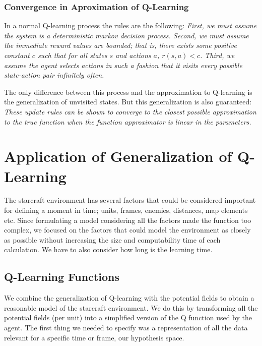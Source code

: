 \subsubsection{Convergence in Aproximation of Q-Learning}

In a normal Q-learning process the rules are the following: \textit{First, we must assume the system is a deterministic markov decision process. Second, we must assume the immediate reward values are bounded; that is, there exists some positive constant $c$ such that for all states $s$ and actions $a$, $r(s,a) < c$. Third, we assume the agent selects actions in such a fashion that it visits every possible state-action pair infinitely often.} \cite[p377]{ml_tom_mitchel} 

The only difference between this process and the approximation to Q-learning is the generalization of unvisited states. But this generalization is also guaranteed: \textit{These update rules can be shown to converge to the closest possible approximation to the true function when the function approximator is linear in the parameters. }\cite[p779]{rl}



\section{Application of Generalization of Q-Learning}	\label{qlearning}

The starcraft environment has several factors that could be considered important for defining a moment in time; units, frames, enemies, distances, map elements etc. Since formulating a model considering all the factors made the function too complex, we focused on the factors that could model the environment as closely as possible without increasing the size and computability time of each calculation. We have to also consider how long is the learning time. 

\subsection{Q-Learning Functions}

We combine the generalization of Q-learning with the potential fields to obtain a reasonable model of the starcraft environment. We do this by transforming all the potential fields (per unit) into a simplified version of the Q function used by the agent. The first thing we needed to specify was a representation of all the data relevant for a specific time or frame, our hypothesis space. 


